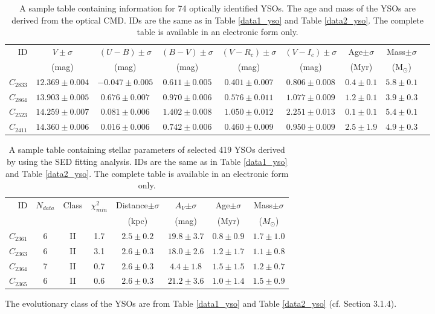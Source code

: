\documentclass[a4paper,fleqn,usenatbib,useAMS]{mnras}
\begin{document}
\begin{table*}
\caption{\label{data3_yso}  A sample table containing information for 74 optically identified YSOs. The age and mass of the YSOs are derived from the optical CMD. IDs are the same as in Table \ref{data1_yso} and Table \ref{data2_yso}. 
The complete table is available in an electronic form only.
 }
\begin{tabular}{@{}rcccccccc@{}}
\hline
ID &  $V\pm \sigma$  & $(U-B) \pm \sigma$ &  $(B-V) \pm \sigma$ &  $(V-R_c)\pm \sigma$& $(V-I_c)\pm \sigma$ & Age$\pm \sigma$ & Mass$\pm \sigma$ \\
  &  (mag)& (mag) &  (mag)& (mag)&  (mag) & (Myr) & (M$_\odot$)  \\
\hline
$C_{2833}$&$12.369\pm0.004$&$-0.047\pm0.005$& $0.611\pm0.005$& $0.401\pm0.007$& $0.806\pm0.008$&  $0.4\pm0.1$ & $5.8\pm0.1$\\
$C_{2864}$&$13.903\pm0.005$&$ 0.676\pm0.007$& $0.970\pm0.006$& $0.576\pm0.011$& $1.077\pm0.009$&  $1.2\pm0.1$ & $3.9\pm0.3$\\
$C_{2523}$&$14.259\pm0.007$&$ 0.081\pm0.006$& $1.402\pm0.008$& $1.050\pm0.012$& $2.251\pm0.013$&  $0.1\pm0.1$ & $5.4\pm0.1$\\
$C_{2411}$&$14.360\pm0.006$&$ 0.016\pm0.006$& $0.742\pm0.006$& $0.460\pm0.009$& $0.950\pm0.009$&  $2.5\pm1.9$ & $4.9\pm0.3$\\
\hline
\end{tabular}
\end{table*}


\begin{table}
\caption{\label{data4_yso}  A sample table containing stellar parameters of selected 419 YSOs derived by using the SED fitting analysis. IDs are the same as in Table \ref{data1_yso} and Table \ref{data2_yso}. The complete table is available in an electronic form only. }
\begin{tabular}{@{}r@{ }c@{ }c@{ }c@{ }c@{ }c@{ }c@{ }c@{}}
\hline
 ID &   $N_{data}$ & Class  & $\chi^2_{min}$ &  Distance$\pm \sigma$   &  $A_V$$\pm \sigma$     &  Age$\pm \sigma$ &  Mass$\pm \sigma$ \\
    &     &     &     &   (kpc)         &   (mag)       & (Myr)      &($M_{\odot}$) \\
\hline
$C_{2361}$ &  6 & II &  1.7 &$2.5\pm0.2$& $19.8\pm3.7$&$0.8\pm0.9$&$1.7\pm1.0$\\
$C_{2363}$ &  6 & II &  3.1 &$2.6\pm0.3$& $18.0\pm2.6$&$1.2\pm1.7$&$1.1\pm0.8$\\
$C_{2364}$ &  7 & II &  0.7 &$2.6\pm0.3$& $ 4.4\pm1.8$&$1.5\pm1.5$&$1.2\pm0.7$\\
$C_{2365}$ &  6 & II &  0.6 &$2.6\pm0.3$& $21.2\pm3.6$&$1.0\pm1.4$&$1.5\pm0.9$\\
\hline
\end{tabular}
The evolutionary class of the YSOs are from Table \ref{data1_yso} and Table \ref{data2_yso} (cf. Section 3.1.4).
\end{table}
\end{document}
